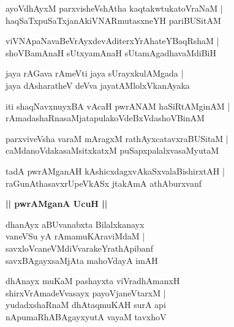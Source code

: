 \documentclass[twoside,12pt,openright]{book}
\newcounter{shloka}[chapter]
\def\uvaca#1{\centerline{{\large\textbf{#1}}}}
\begin{document}
\begin{shloka}%
ayoVdhAyxM parxvisheVshAtha kaqtakwtukatoVraNaM |\\
haqSaTxpuSaTxjanAkiVNARmutasxneYH pariBUSitAM 
\end{shloka}

\begin{shloka}%
viVNApaNavaBeVrAyxdevAditerxYrAhateYBaqRshaM |\\
shoVBamAnaH sUtxyamAnaH sUtamAgadhavaMdiBiH
\end{shloka}

\begin{shloka}%
jaya rAGava rAmeVti jaya sUrayxkulAMgada |\\
jaya dAsharatheV deVva jayatAMlolxVkanAyaka 
\end{shloka}

\begin{shloka}%
iti shaqNavxnuyxBA vAcaH pwrANAM haSiRtAMginAM |\\
rAmadashaRnasaMjatapulakoVdeBxVdashoVBinAM 
\end{shloka}

\begin{shloka}%
parxviveVsha varaM mAragxM  rathAyxcatavxraBUSitaM |\\
caMdanoVdakasaMsitxkatxM puSapxpalalxvasaMyutaM 
\end{shloka}

\begin{shloka}%
tadA pwrAMganAH kAshicxdagxvAkaSxvalaBishirxtAH |\\
raGunAthasavxrUpeVkASx jtakAmA athAburxvanf 
\end{shloka}

\uvaca{|| pwrAMganA UcuH ||}

\begin{shloka}%
dhanAyx aBUvanabxta Bilalxkanayx \\
vaneVSu yA rAmamuKAraviMdaM |\\
savxloVcaneVMdiVvarakeYrathApibanf\\
savxBAgayxsaMjAta mahoVdayA imAH
\end{shloka}

\begin{shloka}%
dhAnayx muKaM pashayxta viVradhAmanxH \\
shirxVrAmadeVvasayx payoVjaneVtarxM |\\
yudadxshaRnaM dhAtaqmuKAH surA api \\
nApumaRhABAgayxyutA vayaM tavxhoV 
\end{shloka}
\end{document}
